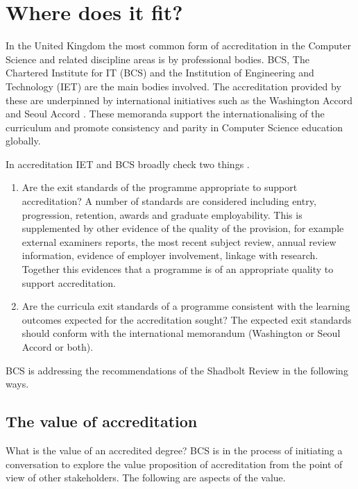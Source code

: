 \documentclass[sigconf]{acmart}
\begin{document}
\section {Where does it fit?}

In the United Kingdom the most common form of accreditation in the Computer Science and related discipline areas is by professional bodies.  BCS, The Chartered Institute for IT (BCS) and the Institution of Engineering and Technology (IET) are the main bodies involved. The accreditation provided by these %
are underpinned by international initiatives such as the Washington Accord \cite[for CEng]{Washington2019} and Seoul Accord \cite[for CITP]{Seoul2019}. These memoranda support the internationalising of the curriculum and promote consistency and parity in Computer Science education globally. 

In accreditation IET and BCS broadly check two things \cite{BCS2018a, IET2019}. 

\begin{enumerate}
    \item Are the exit standards of the programme appropriate to support accreditation?
     A number of standards are considered including entry, progression, retention, awards and graduate employability.  This is supplemented by other evidence of the quality of the provision, for example external examiners reports, the most recent subject review, annual review information, evidence of employer involvement, linkage with research. Together this evidences that a programme is of an appropriate quality to support accreditation.
    \item Are the curricula exit standards of a programme consistent with the learning outcomes expected for the accreditation sought? The expected exit standards should conform with the international memorandum (Washington or Seoul Accord or both). 
\end{enumerate}

BCS is addressing the recommendations of the Shadbolt Review in the following ways.

\subsection{The value of accreditation}
What is the value of an accredited degree?  BCS is in the process of initiating a conversation to explore the value proposition of accreditation from the point of view of other stakeholders. The following are aspects of the value.
\end{document}

